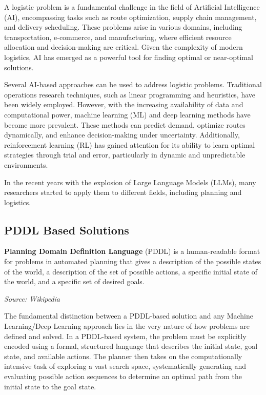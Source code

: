 A logistic problem is a fundamental challenge in the field of Artificial Intelligence
(AI), encompassing tasks such as route optimization, supply chain management,
and delivery scheduling. These problems arise in various domains, including
transportation, e-commerce, and manufacturing, where efficient resource allocation
and decision-making are critical. Given the complexity of modern logistics, AI has
emerged as a powerful tool for finding optimal or near-optimal solutions.

Several AI-based approaches can be used to address logistic problems.
Traditional operations research techniques, such as linear programming and heuristics,
have been widely employed. However, with the increasing availability of data and
computational power, machine learning (ML) and deep learning methods have become
more prevalent. These methods can predict demand, optimize routes dynamically,
and enhance decision-making under uncertainty. Additionally, reinforcement
learning (RL) has gained attention for its ability to learn optimal strategies
through trial and error, particularly in dynamic and unpredictable environments.

In the recent years with the explosion of Large Language Models (LLMs), many
researchers started to apply them to different fields, including planning and logistics.


\subsection{PDDL Based Solutions}
\begin{blockquote}
  \textbf{Planning Domain Definition Language} (PDDL) is a human-readable format
  for problems in automated planning that gives a description of the possible
  states of the world, a description of the set of possible actions, a specific
  initial state of the world, and a specific set of desired goals.

  \emph{Source: Wikipedia\footnotemark}
\end{blockquote}

The fundamental distinction between a PDDL-based solution and any Machine Learning/Deep
Learning approach lies in the very nature of how problems are defined and solved.
In a PDDL-based system, the problem must be explicitly encoded using a formal,
structured language that describes the initial state, goal state, and available
actions. The planner then takes on the computationally intensive task of exploring
a vast search space, systematically generating and evaluating possible action
sequences to determine an optimal path from the initial state to the goal state.


